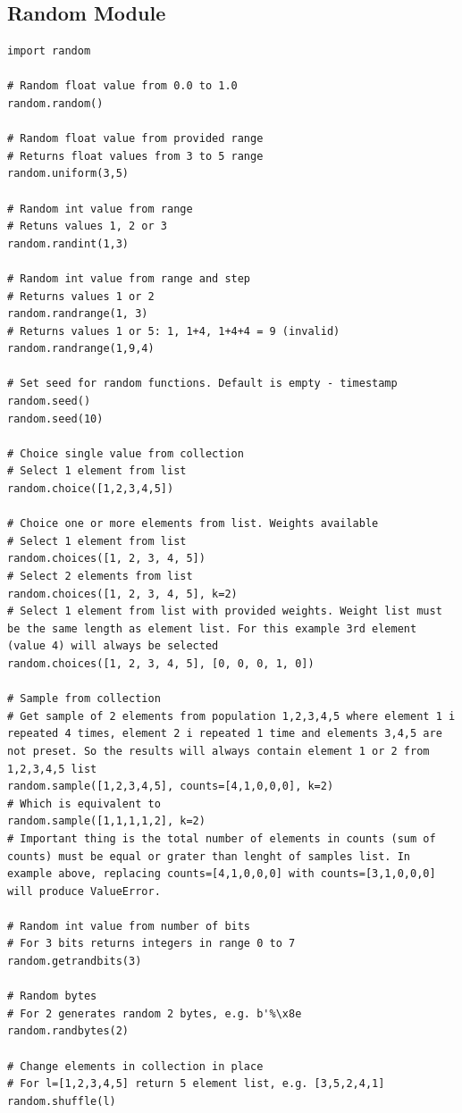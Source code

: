 \documentclass{article}
\begin{document}
\subsection{Random Module}
\begin{lstlisting}[style=pystyle]
import random

# Random float value from 0.0 to 1.0
random.random()

# Random float value from provided range
# Returns float values from 3 to 5 range
random.uniform(3,5)

# Random int value from range
# Retuns values 1, 2 or 3
random.randint(1,3)

# Random int value from range and step
# Returns values 1 or 2
random.randrange(1, 3)
# Returns values 1 or 5: 1, 1+4, 1+4+4 = 9 (invalid)
random.randrange(1,9,4)

# Set seed for random functions. Default is empty - timestamp
random.seed()
random.seed(10)

# Choice single value from collection
# Select 1 element from list
random.choice([1,2,3,4,5])

# Choice one or more elements from list. Weights available
# Select 1 element from list
random.choices([1, 2, 3, 4, 5]) 
# Select 2 elements from list
random.choices([1, 2, 3, 4, 5], k=2)
# Select 1 element from list with provided weights. Weight list must be the same length as element list. For this example 3rd element (value 4) will always be selected
random.choices([1, 2, 3, 4, 5], [0, 0, 0, 1, 0])

# Sample from collection
# Get sample of 2 elements from population 1,2,3,4,5 where element 1 i repeated 4 times, element 2 i repeated 1 time and elements 3,4,5 are not preset. So the results will always contain element 1 or 2 from 1,2,3,4,5 list
random.sample([1,2,3,4,5], counts=[4,1,0,0,0], k=2)
# Which is equivalent to
random.sample([1,1,1,1,2], k=2)
# Important thing is the total number of elements in counts (sum of counts) must be equal or grater than lenght of samples list. In example above, replacing counts=[4,1,0,0,0] with counts=[3,1,0,0,0] will produce ValueError.

# Random int value from number of bits
# For 3 bits returns integers in range 0 to 7
random.getrandbits(3)

# Random bytes
# For 2 generates random 2 bytes, e.g. b'%\x8e
random.randbytes(2) 

# Change elements in collection in place
# For l=[1,2,3,4,5] return 5 element list, e.g. [3,5,2,4,1]
random.shuffle(l)	
\end{lstlisting}
\end{document}

